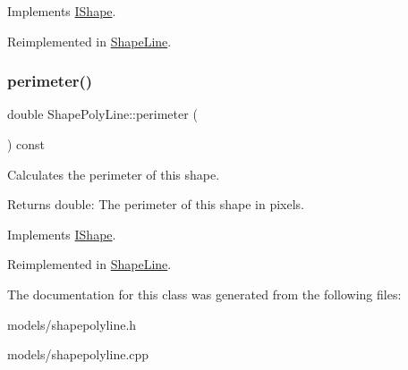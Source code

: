 Implements \mbox{\hyperlink{class_i_shape_a3d23494cd34e658cc6b39a2e2db0b7fe}{I\+Shape}}.



Reimplemented in \mbox{\hyperlink{class_shape_line_a5b6d9bcf7ed64ab2454d5efa66486ee9}{Shape\+Line}}.

\mbox{\label{class_shape_poly_line_a3d6664ada9c9dd883303a3dcb63d6188}} 
\subsubsection{\texorpdfstring{perimeter()}{perimeter()}}
{\footnotesize\ttfamily double Shape\+Poly\+Line\+::perimeter (\begin{DoxyParamCaption}{ }\end{DoxyParamCaption}) const\hspace{0.3cm}{\ttfamily [virtual]}}



Calculates the perimeter of this shape. 

\begin{DoxyReturn}{Returns}
double\+: The perimeter of this shape in pixels. 
\end{DoxyReturn}


Implements \mbox{\hyperlink{class_i_shape_a485f6770c4e56b31c76d368b959b6f00}{I\+Shape}}.



Reimplemented in \mbox{\hyperlink{class_shape_line_a68b22013926993e9bd9c2d146519a5af}{Shape\+Line}}.



The documentation for this class was generated from the following files\+:\begin{DoxyCompactItemize}
\item 
models/shapepolyline.\+h\item 
models/shapepolyline.\+cpp\end{DoxyCompactItemize}
